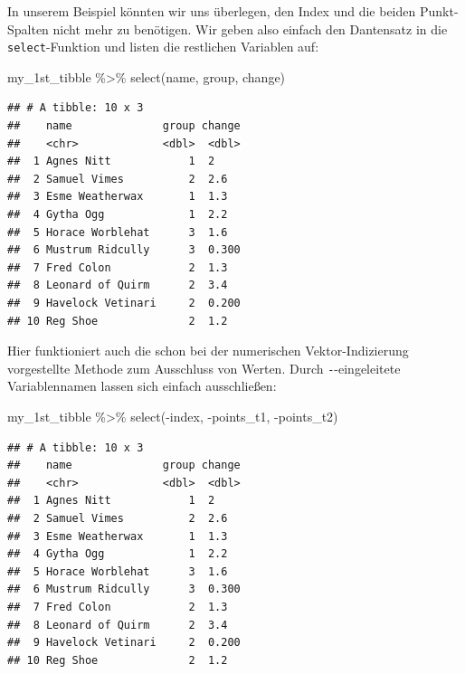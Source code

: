 \documentclass[
]{book}
\newenvironment{Shaded}{\begin{snugshade}}{\end{snugshade}}
\newcommand{\FunctionTok}[1]{\textcolor[rgb]{0.00,0.00,0.00}{#1}}
\newcommand{\NormalTok}[1]{#1}
\newcommand{\SpecialCharTok}[1]{\textcolor[rgb]{0.00,0.00,0.00}{#1}}
\begin{document}
In unserem Beispiel könnten wir uns überlegen, den Index und die beiden Punkt-Spalten nicht mehr zu benötigen. Wir geben also einfach den Dantensatz in die \texttt{select}-Funktion und listen die restlichen Variablen auf:

\begin{Shaded}
\begin{Highlighting}[]
\NormalTok{my\_1st\_tibble }\SpecialCharTok{\%\textgreater{}\%} 
  \FunctionTok{select}\NormalTok{(name, group, change)}
\end{Highlighting}
\end{Shaded}

\begin{verbatim}
## # A tibble: 10 x 3
##    name              group change
##    <chr>             <dbl>  <dbl>
##  1 Agnes Nitt            1  2    
##  2 Samuel Vimes          2  2.6  
##  3 Esme Weatherwax       1  1.3  
##  4 Gytha Ogg             1  2.2  
##  5 Horace Worblehat      3  1.6  
##  6 Mustrum Ridcully      3  0.300
##  7 Fred Colon            2  1.3  
##  8 Leonard of Quirm      2  3.4  
##  9 Havelock Vetinari     2  0.200
## 10 Reg Shoe              2  1.2
\end{verbatim}

Hier funktioniert auch die schon bei der numerischen Vektor-Indizierung vorgestellte Methode zum Ausschluss von Werten. Durch \texttt{-}-eingeleitete Variablennamen lassen sich einfach ausschließen:

\begin{Shaded}
\begin{Highlighting}[]
\NormalTok{my\_1st\_tibble }\SpecialCharTok{\%\textgreater{}\%} 
  \FunctionTok{select}\NormalTok{(}\SpecialCharTok{{-}}\NormalTok{index, }\SpecialCharTok{{-}}\NormalTok{points\_t1, }\SpecialCharTok{{-}}\NormalTok{points\_t2) }
\end{Highlighting}
\end{Shaded}

\begin{verbatim}
## # A tibble: 10 x 3
##    name              group change
##    <chr>             <dbl>  <dbl>
##  1 Agnes Nitt            1  2    
##  2 Samuel Vimes          2  2.6  
##  3 Esme Weatherwax       1  1.3  
##  4 Gytha Ogg             1  2.2  
##  5 Horace Worblehat      3  1.6  
##  6 Mustrum Ridcully      3  0.300
##  7 Fred Colon            2  1.3  
##  8 Leonard of Quirm      2  3.4  
##  9 Havelock Vetinari     2  0.200
## 10 Reg Shoe              2  1.2
\end{verbatim}
\end{document}
